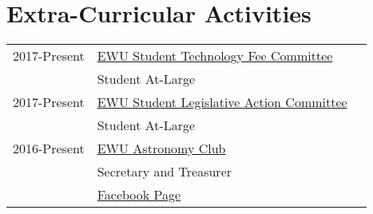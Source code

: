 \documentclass[]{deedy-resume-openfont}
\begin{document}
\begin{minipage}[t]{0.66\textwidth}
\section{Extra-Curricular Activities} 
\begin{tabular}{rll}
2017-Present & \underline{EWU Student Technology Fee Committee}\\
 & Student At-Large\\
2017-Present & \underline{EWU Student Legislative Action Committee}\\
 & Student At-Large\\
2016-Present & \underline{EWU Astronomy Club} \\
 & Secretary and Treasurer\\
 & \href{facebook.com/ewuspaceclub}{Facebook Page}

\end{tabular}
\sectionsep

\end{minipage} 
\end{document}
